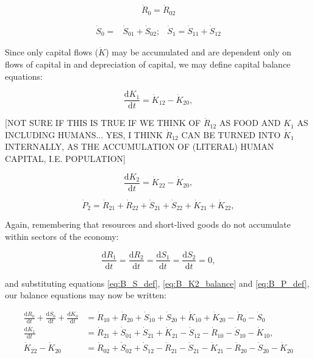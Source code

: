 \begin{equation}
	\dot{R}_{0} = \dot{R}_{02}
\end{equation}

\begin{align}\label{eq:B_S_def}
	\dot{S}_{0} = 
	& \dot{S}_{01} + \dot{S}_{02};
	& \dot{S}_{1} = 
	\dot{S}_{11} + \dot{S}_{12}
\end{align}

Since only capital flows ($\dot{K}$) may be accumulated and are dependent only on flows of capital in and depreciation of capital, we may define capital balance equations:

\begin{equation} \label{eq:B_K1_balance}
	\frac{\mathrm{d}K_{1}}{\mathrm{d}t}
	=  \dot{K}_{12} - \dot{K}_{20},
\end{equation}

[NOT SURE IF THIS IS TRUE IF WE THINK OF $\dot{R}_{12}$ AS FOOD AND $K_{1}$ AS INCLUDING HUMANS... YES, I THINK $\dot{R}_{12}$ CAN BE TURNED INTO  $\dot{K}_{1}$ INTERNALLY, AS THE ACCUMULATION OF (LITERAL) HUMAN CAPITAL, I.E. POPULATION]

\begin{equation} \label{eq:B_K2_balance}
	\frac{\mathrm{d}K_{2}}{\mathrm{d}t}
	=  \dot{K}_{22} - \dot{K}_{20},
\end{equation}

\begin{equation} \label{eq:B_P_def}
	\dot{P}_{2}
	= \dot{R}_{21}
	+ \dot{R}_{22}
	+ \dot{S}_{21}
	+ \dot{S}_{22}
	+ \dot{K}_{21}	 
	+ \dot{K}_{22},
\end{equation}


\noindent Again, remembering that resources and short-lived
goods do not accumulate within sectors of the economy:

\begin{equation}\label{eq:dR_and_dS_zero}
	\frac{\mathrm{d}R_{1}}{\mathrm{d}t}
	= \frac{\mathrm{d}R_{2}}{\mathrm{d}t} 
	= \frac{\mathrm{d}S_{1}}{\mathrm{d}t} 
	= \frac{\mathrm{d}S_{2}}{\mathrm{d}t} 
	= 0,
\end{equation}

\noindent and substituting equations \ref{eq:B_S_def},
\ref{eq:B_K2_balance}  and \ref{eq:B_P_def}, our balance 
equations may now be written:


\begin{align} \label{eq:B_CV_0_to_2_b}
	\frac{\mathrm{d}R_{0}}{\mathrm{d}t} 
	+ \frac{\mathrm{d}S_{0}}{\mathrm{d}t}	
	+ \frac{\mathrm{d}K_0}{\mathrm{d}t}		
	& = \dot{R}_{10} + \dot{R}_{20} 
	+ \dot{S}_{10} + \dot{S}_{20} 
	+ \dot{K}_{10} + \dot{K}_{20} 
	- \dot{R}_{0} 
	- \dot{S}_{0} 							\\
	\frac{\mathrm{d}K_{1}}{\mathrm{d}t}	
	& = \dot{R}_{21} 
	+ \dot{S}_{01} 
	+ \dot{S}_{21}
	+ \dot{K}_{21}
	- \dot{S}_{12} 
	- \dot{R}_{10} 
	- \dot{S}_{10} 
	- \dot{K}_{10},							\\
	\dot{K}_{22} - \dot{K}_{20}	
	& = \dot{R}_{02} 
	+ \dot{S}_{02} 
	+ \dot{S}_{12} 
	- \dot{R}_{21}
	- \dot{S}_{21}
	- \dot{K}_{21}
	- \dot{R}_{20} 
	- \dot{S}_{20} 
	- \dot{K}_{20}							\\
\end{align}



